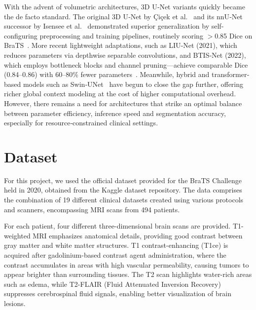 \documentclass[10pt,twocolumn,letterpaper]{article}
\begin{document}
With the advent of volumetric architectures, 3D U‐Net variants quickly became the de facto standard. The original 3D U‐Net by Çiçek et al.~\cite{cicek20163dunetlearningdense} and its nnU‐Net successor by Isensee et al.~\cite{isensee2020nnunetbraintumorsegmentation} demonstrated superior generalization by self‐configuring preprocessing and training pipelines, routinely scoring $>$0.85 Dice on BraTS~\cite{dong2017automatic,bukhari2021e1d3,myronenko2019robust}. More recent lightweight adaptations, such as LIU‐Net (2021), which reduces parameters via depthwise separable convolutions, and BTIS‐Net (2022), which employs bottleneck blocks and channel pruning—achieve comparable Dice (0.84–0.86) with 60–80\% fewer parameters~\cite{Liu2024BTIS,Ahmad2025liu}. Meanwhile, hybrid and transformer‐based models such as Swin‐UNet~\cite{cao2021swinunetunetlikepuretransformer} have begun to close the gap further, offering richer global context modeling at the cost of higher computational overhead. However, there remains a need for architectures that strike an optimal balance between parameter efficiency, inference speed and segmentation accuracy, especially for resource‐constrained clinical settings.


\section{Dataset}
For this project, we used the official dataset\cite{BraTSdataset} provided for the BraTS Challenge held in 2020, obtained from the Kaggle dataset repository. The data comprises the combination of 19 different clinical datasets created using various protocols and scanners, encompassing MRI scans from 494 patients.

For each patient, four different three-dimensional brain scans are provided. T1-weighted MRI emphasizes anatomical details, providing good contrast between gray matter and white matter structures. T1 contrast-enhancing (T1ce) is acquired after gadolinium-based contrast agent administration, where the contrast accumulates in areas with high vascular permeability, causing tumors to appear brighter than surrounding tissues. The T2 scan highlights water-rich areas such as edema, while T2-FLAIR (Fluid Attenuated Inversion Recovery) suppresses cerebrospinal fluid signals, enabling better visualization of brain lesions.
\end{document}
